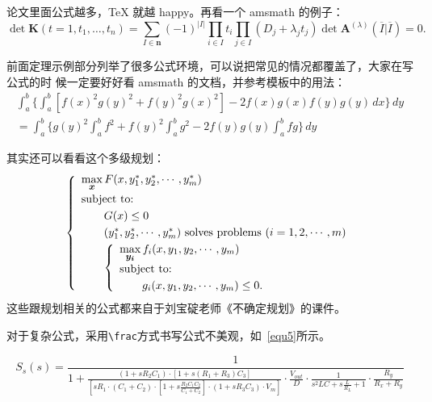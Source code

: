 论文里面公式越多，\TeX{} 就越 happy。再看一个 \textsf{amsmath} 的例子：
\newcommand{\envert}[1]{\left\lvert#1\right\rvert}
\begin{equation}\label{detK2}
\det\mathbf{K}(t=1,t_1,\dots,t_n)=\sum_{I\in\mathbf{n}}(-1)^{\envert{I}}
\prod_{i\in I}t_i\prod_{j\in I}(D_j+\lambda_jt_j)\det\mathbf{A}
^{(\lambda)}(\overline{I}|\overline{I})=0.
\end{equation}

前面定理示例部分列举了很多公式环境，可以说把常见的情况都覆盖了，大家在写公式的时
候一定要好好看 \textsf{amsmath} 的文档，并参考模板中的用法：
\begin{multline*}%
\int_a^b\biggl\{\int_a^b[f(x)^2g(y)^2+f(y)^2g(x)^2]
 -2f(x)g(x)f(y)g(y)\,dx\biggr\}\,dy \\
 =\int_a^b\biggl\{g(y)^2\int_a^bf^2+f(y)^2
  \int_a^b g^2-2f(y)g(y)\int_a^b fg\biggr\}\,dy
\end{multline*}

其实还可以看看这个多级规划：
\begin{equation}\label{bilevel}
\left\{\begin{array}{l}
\max\limits_{{\mbox{\footnotesize\boldmath $x$}}} F(x,y_1^*,y_2^*,\cdots,y_m^*)\\[0.2cm]
\mbox{subject to:}\\[0.1cm]
\qquad G(x)\le 0\\[0.1cm]
\qquad(y_1^*,y_2^*,\cdots,y_m^*)\mbox{ solves problems }(i=1,2,\cdots,m)\\[0.1cm]
\qquad\left\{\begin{array}{l}
    \max\limits_{{\mbox{\footnotesize\boldmath $y_i$}}}f_i(x,y_1,y_2,\cdots,y_m)\\[0.2cm]
    \mbox{subject to:}\\[0.1cm]
    \qquad g_i(x,y_1,y_2,\cdots,y_m)\le 0.
    \end{array}\right.
\end{array}\right.
\end{equation}
这些跟规划相关的公式都来自于刘宝碇老师《不确定规划》的课件。

对于复杂公式，采用\verb|\frac|方式书写公式不美观，如~\ref{equ5}所示。 

\begin{equation}
\label{equ5}
  S_s\left(s\right)  =\frac{1}{1+\frac{\left(1+sR_2C_1\right)\cdot\left[1+s\left(R_1+R_3\right)C_3\right]}{\left[{sR_1}\cdot\left(C_1+C_2\right)\cdot\left[1+s\frac{R_2C_1C_2}{C_1+C_2}\right]\cdot\left(1+sR_3C_3\right)\cdot{V_m}\right]}\cdot\frac{V_{out}}{D}\cdot\frac{1}{s^2LC+{s}\frac{L}{R_L}+1}\cdot\frac{R_y}{R_x+R_y}}
\end{equation}

